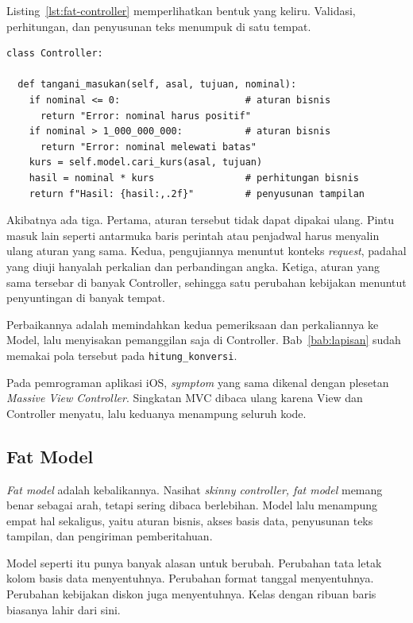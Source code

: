 Listing~\ref{lst:fat-controller} memperlihatkan bentuk yang keliru. Validasi,
perhitungan, dan penyusunan teks menumpuk di satu tempat.

\begin{lstlisting}[style=PythonStyle, caption={Controller yang menggemuk, sebab
  aturan bisnisnya ikut ditulis di dalamnya}, label=lst:fat-controller]
class Controller:

  def tangani_masukan(self, asal, tujuan, nominal):
    if nominal <= 0:                      # aturan bisnis
      return "Error: nominal harus positif"
    if nominal > 1_000_000_000:           # aturan bisnis
      return "Error: nominal melewati batas"
    kurs = self.model.cari_kurs(asal, tujuan)
    hasil = nominal * kurs                # perhitungan bisnis
    return f"Hasil: {hasil:,.2f}"         # penyusunan tampilan
\end{lstlisting}

Akibatnya ada tiga. Pertama, aturan tersebut tidak dapat dipakai ulang. Pintu
masuk lain seperti antarmuka baris perintah atau penjadwal harus menyalin ulang
aturan yang sama. Kedua, pengujiannya menuntut konteks \textit{request}, padahal yang
diuji hanyalah perkalian dan perbandingan angka. Ketiga, aturan yang sama
tersebar di banyak Controller, sehingga satu perubahan kebijakan menuntut
penyuntingan di banyak tempat.

Perbaikannya adalah memindahkan kedua pemeriksaan dan perkaliannya ke Model,
lalu menyisakan pemanggilan saja di Controller. Bab~\ref{bab:lapisan} sudah
memakai pola tersebut pada \texttt{hitung\_konversi}.

Pada pemrograman aplikasi iOS, \textit{symptom} yang sama dikenal dengan plesetan
\textit{Massive View Controller}. Singkatan MVC dibaca ulang karena View dan
Controller menyatu, lalu keduanya menampung seluruh kode.

\subsection{Fat Model}

\textit{Fat model} adalah kebalikannya. Nasihat \textit{skinny controller, fat
model} memang benar sebagai arah, tetapi sering dibaca berlebihan. Model lalu
menampung empat hal sekaligus, yaitu aturan bisnis, akses basis data, penyusunan
teks tampilan, dan pengiriman pemberitahuan.

Model seperti itu punya banyak alasan untuk berubah. Perubahan tata letak
kolom basis data menyentuhnya. Perubahan format tanggal menyentuhnya. Perubahan
kebijakan diskon juga menyentuhnya. Kelas dengan ribuan baris biasanya lahir
dari sini.

